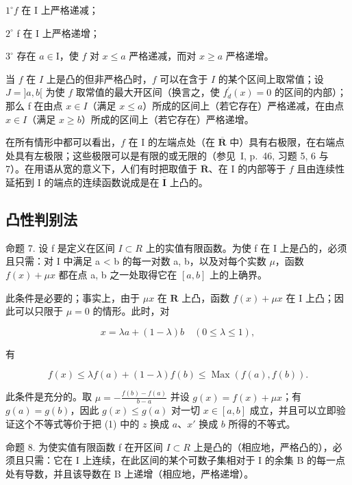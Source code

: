 \(1^{\circ} f\) 在 I 上严格递减；

\(2^{\circ}\) f 在 I 上严格递增；

\(3^{\circ}\) 存在 \(a \in \mathrm{I}\)，使 \(f\) 对 \(x \leqslant a\) 严格递减，而对 \(x \geqslant a\) 严格递增。

当 \(f\) 在 \(I\) 上是凸的但非严格凸时，\(f\) 可以在含于 \(I\) 的某个区间上取常值；设 \(J = ]a, b[\) 为使 \(f\) 取常值的最大开区间（换言之，使 \(f_{d}^{\prime}(x)=0\) 的区间的内部）；那么 f 在由点 \(x\in I\)（满足 \(x\leqslant a\)）所成的区间上（若它存在）严格递减，在由点 \(x\in I\)（满足 \(x\geqslant b\)）所成的区间上（若它存在）严格递增。

在所有情形中都可以看出，\(f\) 在 I 的左端点处（在 \(\overline{\mathbf{R}}\) 中）具有右极限，在右端点处具有左极限；这些极限可以是有限的或无限的（参见~I, p.~46, 习题 5, 6 与 7）。在用语从宽的意义下，人们有时把取值于 \(\overline{\mathbf{R}}\)、在 I 的内部等于 \(f\) 且由连续性延拓到 I 的端点的连续函数说成是在 \(\overline{\mathbf{I}}\) 上凸的。

\subsection{凸性判别法}

命题 7. 设 f 是定义在区间 \(I \subset R\) 上的实值有限函数。为使 f 在 I 上是凸的，必须且只需：对 I 中满足 a \textless{} b 的每一对数 a, b，以及对每个实数 \(\mu\)，函数 \(f(x) + \mu x\) 都在点 a, b 之一处取得它在 \([a, b]\) 上的上确界。

此条件是必要的；事实上，由于 \(\mu x\) 在 \(\mathbf{R}\) 上凸，函数 \(f(x) + \mu x\) 在 I 上凸；因此可以只限于 \(\mu = 0\) 的情形。此时，对

\[
x = \lambda a + (1 - \lambda) b \quad (0 \leqslant \lambda \leqslant 1),
\]

有

\[
f (x) \leqslant \lambda f (a) + (1 - \lambda) f (b) \leqslant \operatorname{Max} (f (a), f (b)).
\]

此条件是充分的。取 \(\mu = -\frac{f(b) - f(a)}{b - a}\) 并设 \(g(x) = f(x) + \mu x\)；有 \(g(a) = g(b)\)，因此 \(g(x) \leqslant g(a)\) 对一切 \(x \in [a, b]\) 成立，并且可以立即验证这个不等式等价于把 (1) 中的 \(z\) 换成 \(a\)、\(x'\) 换成 \(b\) 所得的不等式。

命题 8. 为使实值有限函数 f 在开区间 \(I \subset R\) 上是凸的（相应地，严格凸的），必须且只需：它在 I 上连续，在此区间的某个可数子集相对于 I 的余集 B 的每一点处有导数，并且该导数在 B 上递增（相应地，严格递增）。

